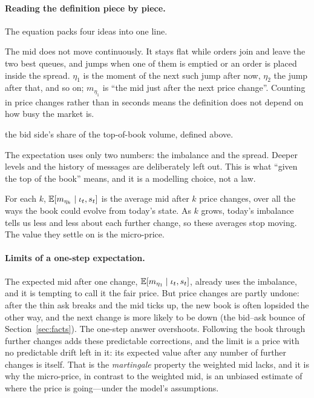 \paragraph{Reading the definition piece by piece.} The equation packs four ideas into one line.
\begin{description}[leftmargin=1.5em,style=nextline,itemsep=2pt]
\item[The times $\eta_1 < \eta_2 < \cdots$] The mid does not move continuously. It stays flat while
  orders join and leave the two best queues, and jumps when one of them is emptied or an order is
  placed inside the spread. $\eta_1$ is the moment of the next such jump after now, $\eta_2$ the jump
  after that, and so on; $m_{\eta_1}$ is ``the mid just after the next price change''. Counting in
  price changes rather than in seconds means the definition does not depend on how busy the market
  is.
\item[The imbalance $\iota_t$] the bid side's share of the top-of-book volume, defined above.
\item[The conditioning ``$\mid \iota_t, s_t$''] The expectation uses only two numbers: the
  imbalance and the spread. Deeper levels and the history of messages are deliberately left out. This
  is what ``given the top of the book'' means, and it is a modelling choice, not a law.
\item[The limit $k \to \infty$] For each $k$, $\mathbb{E}[m_{\eta_k} \mid \iota_t, s_t]$ is the average mid
  after $k$ price changes, over all the ways the book could evolve from today's state. As $k$ grows,
  today's imbalance tells us less and less about each further change, so these averages stop moving.
  The value they settle on is the micro-price.
\end{description}

\paragraph{Limits of a one-step expectation.} The expected mid after one change,
$\mathbb{E}[m_{\eta_1} \mid \iota_t, s_t]$, already uses the imbalance, and it is tempting to call it the fair
price. But price changes are partly undone: after the thin ask breaks and the mid ticks up, the new
book is often lopsided the other way, and the next change is more likely to be down (the bid--ask
bounce of Section~\ref{sec:facts}). The one-step answer overshoots. Following the book through further
changes adds these predictable corrections, and the limit is a price with no predictable drift left
in it: its expected value after any number of further changes is itself. That is the
\emph{martingale} property the weighted mid lacks, and it is why the micro-price, in contrast to the weighted
mid, is an unbiased estimate of where the price is going---under the model's assumptions.

